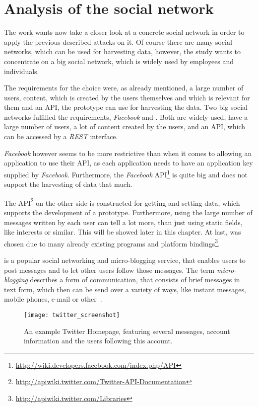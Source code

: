 \chapter{Analysis of the social network \Twitter}
\label{chap:analysis}

The work wants now take a closer look at a concrete social network in order to
apply the previous described attacks on it. Of course there are many social
networks, which can be used for harvesting data, however, the study wants to
concentrate on a big social network, which is widely used by employees and
individuals.

The requirements for the choice were, as already mentioned, a large number of
users, content, which is created by the users themselves and which is
relevant for them and an API, the prototype can use for harvesting the data.
Two big social networks fulfilled the requirements, \textit{Facebook} and \Twitter. Both are
widely used, have a large number of users, a lot of content created by the
users, and an API, which can be accessed by a \textit{REST} interface.

\textit{Facebook} however seems to be more restrictive than \Twitter{} when it
comes to allowing an application to use their API, as each application needs to
have an application key supplied by \textit{Facebook}. Furthermore, the
\textit{Facebook}
API\footnote{\url{http://wiki.developers.facebook.com/index.php/API}} is quite
big and does not support the harvesting of data that much.

The \Twitter{}
API\footnote{\url{http://apiwiki.twitter.com/Twitter-API-Documentation}} on the
other side is constructed for getting and setting data, which supports the
development of a prototype. Furthermore, using the large number of messages
written by each \Twitter{} user can tell a lot more, than just using static
fields, like interests or similar. This will be showed later in this chapter.
At last, \Twitter{} was chosen due to many already existing programs and
platform bindings\footnote{\url{http://apiwiki.twitter.com/Libraries}}.

\Twitter{} is a popular social networking and micro-blogging service, that
enables users to post messages and to let other users follow those messages.
The term \textit{micro-blogging} describes a form of communication, that
consists of brief messages in text form, which then can be send over a variety
of ways, like instant messages, mobile phones, e-mail or other~\cite{java2007}.

\begin{figure}[hbt]
  \centering
  \texttt{[image: twitter\_screenshot]}
  \caption{An example Twitter Homepage, featuring several \Twitter{}
  messages, account information and the users following this account.}
  \label{fig:twitter_screenshot}
\end{figure}

